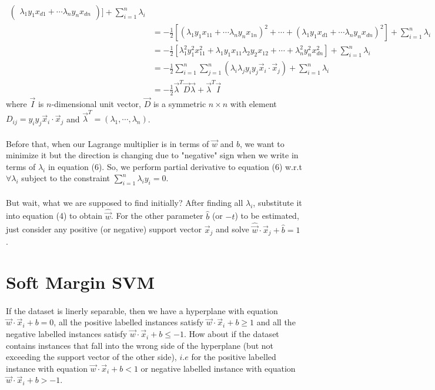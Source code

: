 \documentclass{article}
\begin{document}
\begin{align}
\begin{pmatrix}
    \lambda_1 y_1 x_{d1} + \cdots \lambda_n y_n x_{dn} \end{pmatrix}
    ] + \displaystyle\sum_{i=1}^{n} \lambda_i \nonumber \\
    &= - \frac{1}{2}[(\lambda_1 y_1 x_{11} + \cdots \lambda_n y_n x_{1n})^2 + \cdots + (\lambda_1 y_1 x_{d1} + \cdots \lambda_n y_n x_{dn})^2] +
    \displaystyle\sum_{i=1}^{n} \lambda_i \nonumber \\
    &=- \frac{1}{2}[\lambda_1^2 y_1^2 x_{11}^2 + \lambda_1 y_1 x_{11}\lambda_2 y_2 x_{12} + \cdots + \lambda_n^2 y_n^2 x_{dn}^2] +
    \displaystyle\sum_{i=1}^{n} \lambda_i \nonumber \\
    &= - \frac{1}{2} \displaystyle\sum_{i=1}^{n} \sum_{j=1}^{n}
    (\lambda_i\lambda_j y_i y_j \Vec{x}_i \cdot \Vec{x}_j) +  \displaystyle\sum_{i=1}^{n} \lambda_i \nonumber \\
    &= - \frac{1}{2} \Vec{\lambda}^T \Vec{D} \Vec{\lambda} + \Vec{\lambda}^T \Vec{I}
\end{align}
where $\Vec{I}$ is $n$-dimensional unit vector, $\Vec{D}$ is a symmetric $n\times n$ with element $D_{ij} = y_i y_j \Vec{x}_i \cdot \Vec{x}_j$ and $\Vec{\lambda}^T = (\lambda_1, \cdots, \lambda_n)$. 
\paragraph{}
Before that, when our Lagrange multiplier is in terms of $\Vec{w}$ and $b$, we want to minimize it but the direction is changing due to "negative" sign when we write in terms of $\lambda_i$ in equation (6). So, we perform partial derivative to equation (6) w.r.t $\forall \lambda_i$ subject to the constraint $\displaystyle\sum_{i=1}^{n} \lambda_i y_i = 0$. 
\paragraph{}
But wait, what we are supposed to find initially? After finding all $\lambda_i$, substitute it into equation (4) to obtain $\hat{\Vec{w}}$. For the other parameter $\hat{b}$ (or $-t$) to be estimated, just consider any positive (or negative) support vector $\Vec{x}_j$ and solve $\hat{\Vec{w}} \cdot \Vec{x}_j + \hat{b} = 1$.

\section{Soft Margin SVM}
\paragraph{}
If the dataset is linerly separable, then we have a hyperplane with equation $\Vec{w} \cdot \Vec{x}_i + b = 0$, all the positive labelled instances satisfy $\Vec{w} \cdot \Vec{x}_i + b \geq 1$ and all the negative labelled instances satisfy $\Vec{w} \cdot \Vec{x}_i + b \leq -1$. How about if the dataset contains instances that fall into the wrong side of the hyperplane (but not exceeding the support vector of the other side), $i.e$ for the positive labelled instance with equation $\Vec{w} \cdot \Vec{x}_{i} + b < 1$ or negative labelled instance with equation $\Vec{w} \cdot \Vec{x}_{i} + b > -1$.
\end{document}
